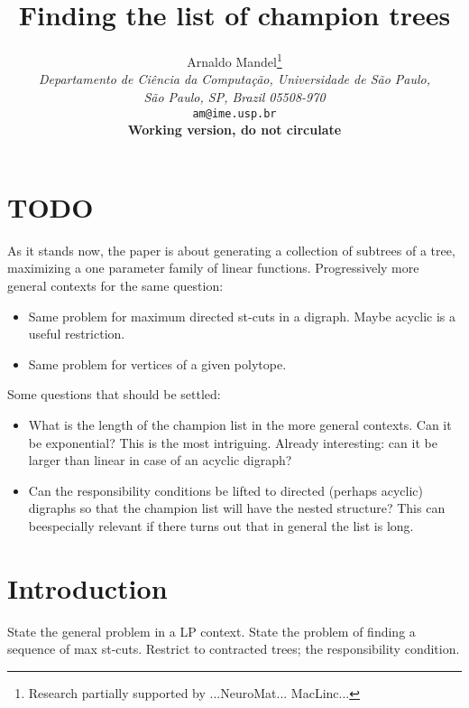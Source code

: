 \documentclass[12pt]{article}
\begin{document}
\title{Finding the list of champion trees}
\author{Arnaldo Mandel\thanks{Research partially supported by ...NeuroMat... MacLinc...}\\[-5pt]
  \emph{\small Departamento de Ci\^encia da Computa\c{c}\~ao, Universidade de
    S\~ao Paulo,}\\[-5pt]
  \emph{\small S\~ao Paulo, SP, Brazil 05508-970}\\[-5pt]
  \texttt{\small am@ime.usp.br}\\
  \textbf{\Large Working version, do not circulate}}

\maketitle
\section{TODO}
As it stands now, the paper is about generating a collection of subtrees of a
tree, maximizing a one parameter family of linear functions.  Progressively
more general contexts for the same question:
\begin{itemize}
    \item Same problem for maximum directed st-cuts in a digraph.  Maybe
  acyclic is a useful restriction.

    \item Same problem for vertices of a given polytope.
\end{itemize}

Some questions that should be settled:
\begin{itemize}
    \item What is the length of the champion list in the more general
  contexts.  Can it be exponential?  This is the most intriguing.  Already
  interesting: can it be larger than linear in case of an acyclic digraph?

    \item Can the responsibility conditions be lifted to directed (perhaps
  acyclic) digraphs so that the champion list will have the nested structure?
  This can beespecially relevant if there turns out that in general the list
  is long.
\end{itemize}

\section{Introduction}
State the general problem in a LP context.  State the problem of finding a
sequence of max st-cuts.  Restrict to contracted trees; the responsibility
condition.
\end{document}
